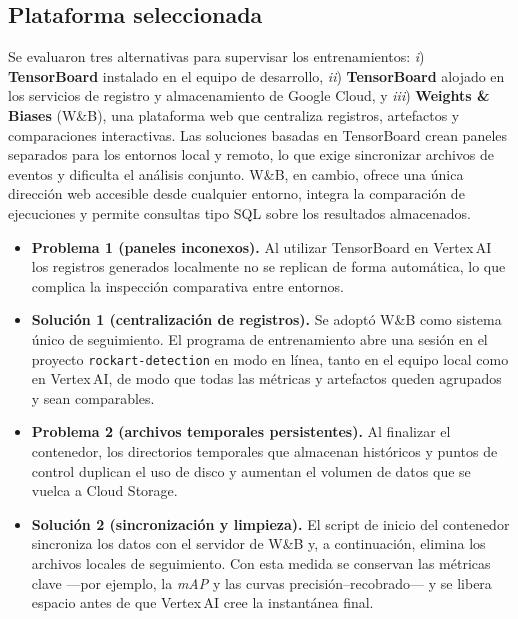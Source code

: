 \subsection{Plataforma seleccionada}\label{ssec:wandb}

Se evaluaron tres alternativas para supervisar los entrenamientos:
\textit{i}) \textbf{TensorBoard} instalado en el equipo de desarrollo,
\textit{ii}) \textbf{TensorBoard} alojado en los servicios de registro y almacenamiento de Google Cloud,
y \textit{iii}) \textbf{Weights \& Biases} (W\&B), una plataforma web que centraliza registros, artefactos y comparaciones interactivas.
Las soluciones basadas en TensorBoard crean paneles separados para los entornos local y remoto, lo que exige sincronizar archivos de eventos y dificulta el análisis conjunto.
W\&B, en cambio, ofrece una única dirección web accesible desde cualquier entorno, integra la comparación de ejecuciones y permite consultas tipo SQL sobre los resultados almacenados.

\begin{itemize}

  \item \textbf{Problema 1 (paneles inconexos).}
        Al utilizar TensorBoard en Vertex\,AI los registros generados localmente no se replican de forma automática, lo que complica la inspección comparativa entre entornos.

  \item \textbf{Solución 1 (centralización de registros).}
        Se adoptó W\&B como sistema único de seguimiento.
        El programa de entrenamiento abre una sesión en el proyecto \texttt{rockart-detection} en modo en línea, tanto en el equipo local como en Vertex\,AI, de modo que todas las métricas y artefactos queden agrupados y sean comparables.

  \item \textbf{Problema 2 (archivos temporales persistentes).}
        Al finalizar el contenedor, los directorios temporales que almacenan históricos y puntos de control duplican el uso de disco y aumentan el volumen de datos que se vuelca a Cloud Storage.

  \item \textbf{Solución 2 (sincronización y limpieza).}
        El script de inicio del contenedor sincroniza los datos con el servidor de W\&B y, a continuación, elimina los archivos locales de seguimiento.
        Con esta medida se conservan las métricas clave —por ejemplo, la \textit{mAP} y las curvas precisión–recobrado— y se libera espacio antes de que Vertex\,AI cree la instantánea final.

\end{itemize}

